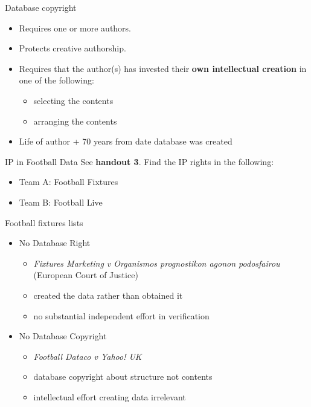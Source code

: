 \documentclass[aspectratio=169,14pt]{beamer}
\begin{document}
\begin{frame}{Database copyright}
  \begin{itemize}
  \item Requires one or more authors.
  \item Protects creative authorship.
  \item Requires that the author(s) has invested their {\bf own intellectual creation} in one of the following:
    \begin{itemize}
    \item selecting the contents
    \item arranging the contents
    \end{itemize}
  \item Life of  author + 70 years from date database was created
  \end{itemize}
\end{frame}

%

  \begin{frame}{IP in Football Data}
    See {\bf handout 3}. Find the IP rights in the following:
    \begin{itemize}
    \item Team A: Football Fixtures
    \item Team B: Football Live
    \end{itemize}
  \end{frame}


  \begin{frame}{Football fixtures lists}
      \begin{itemize}
      \item No Database Right
        \begin{itemize}
        \item {\protect\textit{Fixtures Marketing v Organismos prognostikon agonon podosfairou }} (European Court of Justice)
        \item created the data rather than obtained it
        \item no substantial independent effort in verification
        \end{itemize}
      \item No Database Copyright
        \begin{itemize}
        \item {\protect\textit{Football Dataco v Yahoo! UK}}
        \item database copyright about structure not contents
        \item intellectual effort creating data irrelevant
        \end{itemize}
      \end{itemize}
  \end{frame}
\end{document}

